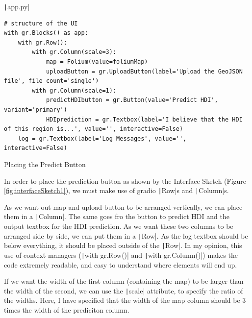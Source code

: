 \documentclass[12pt]{report}
\newcommand{\pil}[1]{\protect\texttt|#1|}
\begin{document}
\begin{center}
\end{center}

\begin{listing}[H]
\pil{app.py}
\begin{verbatim}
# structure of the UI
with gr.Blocks() as app:
    with gr.Row():
        with gr.Column(scale=3):
            map = Folium(value=foliumMap)
            uploadButton = gr.UploadButton(label='Upload the GeoJSON file', file_count='single')
        with gr.Column(scale=1):
            predictHDIbutton = gr.Button(value='Predict HDI', variant='primary')
            HDIprediction = gr.Textbox(label='I believe that the HDI of this region is...', value='', interactive=False)
    log = gr.Textbox(label='Log Messages', value='', interactive=False)
\end{verbatim}
\caption{Placing the Predict Button}\label{cs:placePredict}
\end{listing}

In order to place the prediction button as shown by the Interface Sketch (Figure \ref{fig:interfaceSketch1}), we must make use of gradio \pil{Row}s and \pil{Column}s.

As we want out map and upload button to be arranged vertically, we can place them in a \pil{Column}. The same goes fro the button to predict HDI and the output textbox for the HDI prediction. As we want these two columns to be arranged side by side, we can put them in a \pil{Row}. As the log textbox should be below everything, it should be placed outside of the \pil{Row}. In my opinion, this use of context managers (\pil{with gr.Row()} and \pil{with gr.Column()}) makes the code extremely readable, and easy to understand where elements will end up.

If we want the width of the first column (containing the map) to be larger than the width of the second, we can use the \pil{scale} attribute, to specify the ratio of the widths. Here, I have specified that the width of the map column should be 3 times the width of the prediciton column.
\end{document}
